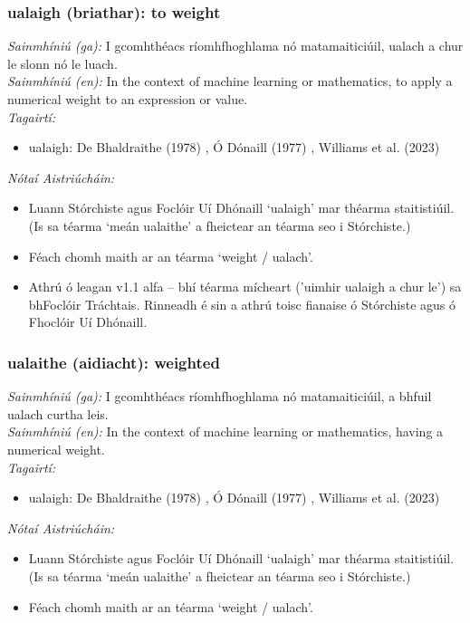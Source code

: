 \subsubsection*{ualaigh (briathar): to weight}
 \noindent \textit{Sainmhíniú (ga):} I gcomhthéacs ríomhfhoghlama nó matamaiticiúil, ualach a chur le slonn nó le luach.
\\
 \noindent \textit{Sainmhíniú (en):} In the context of machine learning or mathematics, to apply a numerical weight to an expression or value.
\\
 \noindent \textit{Tagairtí:}
\begin{itemize}
	\item ualaigh: De Bhaldraithe (1978) \cite{de-bhaldraithe}, Ó Dónaill (1977) \cite{odonaill}, Williams et al. (2023) \cite{storchiste}
\end{itemize}

 \noindent \textit{Nótaí Aistriúcháin:}
\begin{itemize}
	\item Luann Stórchiste agus Foclóir Uí Dhónaill `ualaigh' mar théarma staitistiúil. (Is sa téarma `meán ualaithe' a fheictear an téarma seo i Stórchiste.)
	\item Féach chomh maith ar an téarma `weight / ualach'.
	\item Athrú ó leagan v1.1 alfa -- bhí téarma mícheart ('uimhir ualaigh a chur le') sa bhFoclóir Tráchtais. Rinneadh é sin a athrú toisc fianaise ó Stórchiste agus ó Fhoclóir Uí Dhónaill.
\end{itemize}


\subsubsection*{ualaithe (aidiacht): weighted}
 \noindent \textit{Sainmhíniú (ga):} I gcomhthéacs ríomhfhoghlama nó matamaiticiúil, a bhfuil ualach curtha leis.
\\
 \noindent \textit{Sainmhíniú (en):} In the context of machine learning or mathematics, having a numerical weight.
\\
 \noindent \textit{Tagairtí:}
\begin{itemize}
	\item ualaigh: De Bhaldraithe (1978) \cite{de-bhaldraithe}, Ó Dónaill (1977) \cite{odonaill}, Williams et al. (2023) \cite{storchiste}
\end{itemize}

 \noindent \textit{Nótaí Aistriúcháin:}
\begin{itemize}
	\item Luann Stórchiste agus Foclóir Uí Dhónaill `ualaigh' mar théarma staitistiúil. (Is sa téarma `meán ualaithe' a fheictear an téarma seo i Stórchiste.)
	\item Féach chomh maith ar an téarma `weight / ualach'.
\end{itemize}


